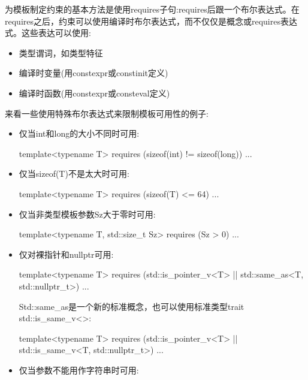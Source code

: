 为模板制定约束的基本方法是使用requires子句:requires后跟一个布尔表达式。在requires之后，约束可以使用编译时布尔表达式，而不仅仅是概念或requires表达式。这些表达可以使用:

\begin{itemize}
\item
类型谓词，如类型特征

\item
编译时变量(用constexpr或constinit定义)

\item
编译时函数(用constexpr或consteval定义)
\end{itemize}

来看一些使用特殊布尔表达式来限制模板可用性的例子:

\begin{itemize}
\item
仅当int和long的大小不同时可用:

\begin{cpp}
template<typename T>
requires (sizeof(int) != sizeof(long))
...
\end{cpp}

\item
仅当sizeof(T)不是太大时可用:

\begin{cpp}
template<typename T>
requires (sizeof(T) <= 64)
...
\end{cpp}

\item
仅当非类型模板参数Sz大于零时可用:

\begin{cpp}
template<typename T, std::size_t Sz>
requires (Sz > 0)
...
\end{cpp}

\item
仅对裸指针和nullptr可用:

\begin{cpp}
template<typename T>
requires (std::is_pointer_v<T> || std::same_as<T, std::nullptr_t>)
...
\end{cpp}

Std::same\_as是一个新的标准概念，也可以使用标准类型trait std::is\_same\_v<>:

\begin{cpp}
template<typename T>
requires (std::is_pointer_v<T> || std::is_same_v<T, std::nullptr_t>)
...
\end{cpp}

\item
仅当参数不能用作字符串时可用:


\end{itemize}

